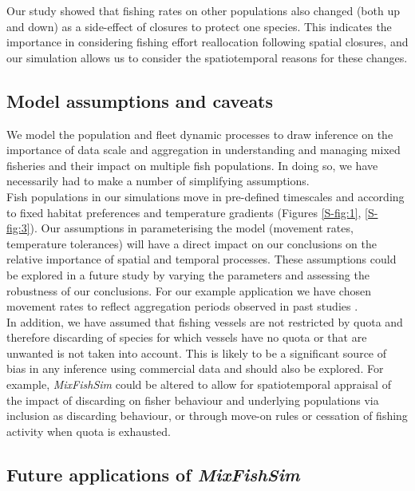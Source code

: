 \documentclass[review]{elsarticle}
\begin{document}
Our study showed that fishing rates on other populations also changed (both up
and down) as a side-effect of closures to protect one species.  This indicates
the importance in considering fishing effort reallocation following spatial
closures, and our simulation allows us to consider the spatiotemporal reasons
for these changes.

\subsection{Model assumptions and caveats}

We model the population and fleet dynamic processes to draw inference on the
importance of data scale and aggregation in understanding and managing mixed
fisheries and their impact on multiple fish populations. In doing so, we have
necessarily had to make a number of simplifying assumptions. \\

Fish populations in our simulations move in pre-defined timescales and
according to fixed habitat preferences and temperature gradients (Figures
\ref{S-fig:1}, \ref{S-fig:3}). Our assumptions in parameterising the model
(movement rates, temperature tolerances) will have a direct impact on our
conclusions on the relative importance of spatial and temporal processes. These
assumptions could be explored in a future study by varying the parameters and
assessing the robustness of our conclusions. For our example application we
have chosen movement rates to reflect aggregation periods observed in past
studies \citep{Poos2007}. \\

In addition, we have assumed that fishing vessels are not restricted by quota
and therefore discarding of species for which vessels have no quota or that are
unwanted is not taken into account. This is likely to be a significant source
of bias in any inference using commercial data and should also be explored. For
example, \textit{MixFishSim} could be altered to allow for spatiotemporal
appraisal of the impact of discarding on fisher behaviour and underlying
populations via inclusion as discarding behaviour, or through move-on rules or
cessation of fishing activity when quota is exhausted. \\

\subsection{Future applications of \textit{MixFishSim}}
\end{document}
